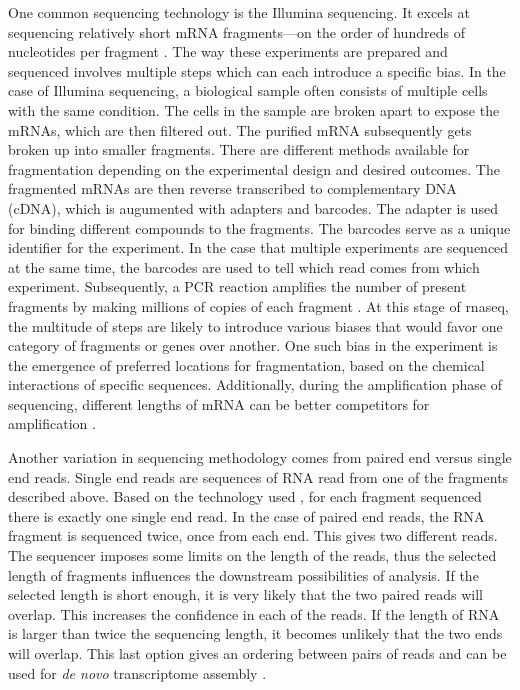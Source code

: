 \documentclass[12pt]{article}
\begin{document}
    One common sequencing technology is the Illumina sequencing. It excels at sequencing relatively short mRNA fragments---on the order of hundreds of nucleotides per fragment \cite{Illumina, illuminaSeq}.  The way these experiments are prepared and sequenced involves multiple steps which can each introduce a specific bias. In the case of Illumina sequencing, a biological sample often consists of multiple cells with the same condition. The cells in the sample are broken apart to expose the mRNAs, which are then filtered out. The purified mRNA subsequently gets broken up into smaller fragments. There are different methods available for fragmentation depending on the experimental design and desired outcomes. The fragmented mRNAs are then reverse transcribed to complementary DNA (cDNA), which is augumented with adapters and barcodes. The adapter is used for binding different compounds to the fragments. The barcodes serve as a unique identifier for the experiment. In the case that multiple experiments are sequenced at the same time, the barcodes are used to tell which read comes from which experiment. Subsequently, a PCR reaction amplifies the number of present fragments by making millions of copies of each fragment \cite{Goswami2016}. At this stage of \acrshort{rnaseq}, the multitude of steps are likely to introduce various biases that would favor one category of fragments or genes over another. One such bias in the experiment is the emergence of preferred locations for fragmentation, based on the chemical interactions of specific sequences. Additionally, during the amplification phase of sequencing, different lengths of mRNA can be better competitors for amplification \cite{Lahens2014}. 
    
    Another variation in sequencing methodology comes from paired end versus single end reads. Single end reads are sequences of RNA read from one of the fragments described above. Based on the technology used \cite{Freedman2020}, for each fragment sequenced there is exactly one single end read. In the case of paired end reads, the RNA fragment is sequenced twice, once from each end. This gives two different reads. The sequencer imposes some limits on the length of the reads, thus the selected length of fragments influences the downstream possibilities of analysis. If the selected length is short enough, it is very likely that the two paired reads will overlap. This increases the confidence in each of the reads. If the length of RNA is larger than twice the sequencing length, it becomes unlikely that the two ends will overlap. This last option gives an ordering between pairs of reads and can be used for \textit{de novo} transcriptome assembly \cite{Hlzer2019}.
    
\end{document}
